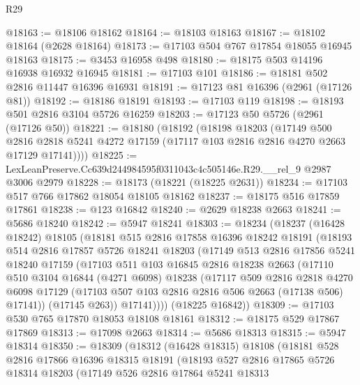 \begin{lexlean}{R29}
\begin{coremodule}
@18163 := @18106 @18162
@18164 := @18103 @18163
@18167 := @18102 @18164 (@2628 @18164)
@18173 := @17103 @504 @767 @17854 @18055 @16945 @18163
@18175 := @3453 @16958 @498
@18180 := @18175 @503 @14196 @16938 @16932 @16945
@18181 := @17103 @101
@18186 := @18181 @502 @2816 @11447 @16396 @16931
@18191 := @17123 @81 @16396 (@2961 (@17126 @81))
@18192 := @18186 @18191
@18193 := @17103 @119
@18198 := @18193 @501 @2816 @3104 @5726 @16259
@18203 := @17123 @50 @5726 (@2961 (@17126 @50))
@18221 := @18180
    (@18192
      (@18198
        @18203
        (@17149
          @500
          @2816
          @2818
          @5241
          @4272
          @17159
          (@17117 @103 @2816 @2816 @4270 @2663 @17129 @17141))))
@18225 := LexLeanPreserve.Cc639d244984595f0311043c4c505146e.R29.__rel_9 @2987 @3006 @2979
@18228 := @18173 (@18221 (@18225 @2631))
@18234 := @17103 @517 @766 @17862 @18054 @18105 @18162
@18237 := @18175 @516 @17859 @17861
@18238 := @123 @16842
@18240 := @2629 @18238 @2663
@18241 := @5686 @18240
@18242 := @5947 @18241
@18303 := @18234
    (@18237
      (@16428 @18242)
      @18105
      (@18181
        @515
        @2816
        @17858
        @16396
        @18242
        @18191
        (@18193
          @514
          @2816
          @17857
          @5726
          @18241
          @18203
          (@17149
            @513
            @2816
            @17856
            @5241
            @18240
            @17159
            (@17103
              @511
              @103
              @16845
              @2816
              @18238
              @2663
              (@17110
                @510
                @3104
                @16844
                (@4271 @6098)
                @18238
                (@17117
                  @509
                  @2816
                  @2818
                  @4270
                  @6098
                  @17129
                  (@17103 @507 @103 @2816 @2816 @506 @2663 (@17138 @506) @17141))
                (@17145 @263))
              @17141))))
      (@18225 @16842))
@18309 := @17103 @530 @765 @17870 @18053 @18108 @18161
@18312 := @18175 @529 @17867 @17869
@18313 := @17098 @2663
@18314 := @5686 @18313
@18315 := @5947 @18314
@18350 := @18309
    (@18312
      (@16428 @18315)
      @18108
      (@18181
        @528
        @2816
        @17866
        @16396
        @18315
        @18191
        (@18193
          @527
          @2816
          @17865
          @5726
          @18314
          @18203
          (@17149
            @526
            @2816
            @17864
            @5241
            @18313

\end{coremodule}
\end{lexlean}
